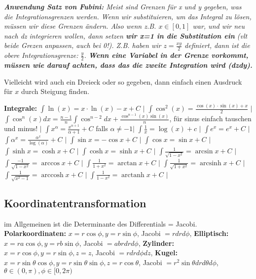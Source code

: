 \documentclass[a3paper, ngerman, 8pt]{article}
\DeclareMathOperator{\arcsinh}{arcsinh}
\DeclareMathOperator{\arccosh}{arccosh}
\DeclareMathOperator{\arctanh}{arctanh}
\begin{document}
\begin{multicols*}{3}
\textit{\textbf{Anwendung Satz von Fubini:} Meist sind Grenzen für x und y gegeben, was die Integrationsgrenzen werden. Wenn wir substituieren, um das Integral zu lösen, müssen wir diese Grenzen ändern. Also wenn z.B. $x\in [0,1]$ war, und wir neu nach dz integrieren wollen, dann setzen \textbf{wir x=1 in die Substitution ein} (vlt beide Grezen anpassen, auch bei 0!). Z.B. haben wir $z=\frac{xy}{2}$ definiert, dann ist die obere Integrationsgrenze: $\frac{y}{2}$. \textbf{Wenn eine Variabel in der Grenze vorkommt, müssen wie darauf achten, dass das die zweite Integration wird (dzdy). }}

Vielleicht wird auch ein Dreieck oder so gegeben, dann einfach einen Ausdruck für $x$ durch Steigung finden. 

\textbf{Integrale:} 
$\int \ln(x)=x\cdot \ln(x) - x + C$ $\big \vert$ 
$\int \cos^2(x)=\frac{\cos(x)\cdot \sin(x) + x}{2}$ $\big \vert$ 
$\int \cos^n(x)dx=\frac{n-1}{n}\int \cos^{n-2}dx+\frac{\cos^{n-1}(x)\sin(x)}{n}$,
für sinus einfach tauschen und minus! $\big \vert$
$\int x^{\alpha} = \frac{x^{\alpha + 1}}{\alpha + 1} + C$ falls $\alpha \neq -1 \big \vert$
$\int \frac{1}{x} = \log (x) + c$ $\big \vert$
$\int e^x = e^x + C$ $\big \vert$
$\int \alpha^{x} = \frac{\alpha^{x}}{\log (\alpha)} + C$ $\big \vert$
$\int \sin x = -\cos x + C$ $\big \vert$
$\int \cos x = \sin x + C$ $\big \vert$
$\int \sinh x = \cosh x + C$ $\big \vert$
$\int \cosh x = \sinh x + C$ $\big \vert$
$\int \frac{1}{\sqrt{1 - x^2}} = \arcsin x + C$ $\big \vert$ %
$\int \frac{-1}{\sqrt{1 - x^2}} = \arccos x + C$ $\big \vert$
$\int \frac{1}{1 + x^2} = \arctan x + C$ $\big \vert$
$\int \frac{1}{\sqrt{1 + x^2}} = \arcsinh x + C$ $\big \vert$
$\int \frac{1}{\sqrt{x^2 - 1}} = \arccosh x + C$ $\big \vert$
$\int \frac{1}{1 - x^2} = \arctanh x + C$ $\big \vert$


\subsection*{Koordinatentransformation}
im Allgemeinen ist die Determinante des Differentials = Jacobi. 
\textbf{Polarkoordinaten: } $x= r \cos\phi, y=r \sin\phi$, Jacobi $=rdrd\phi$, 
\textbf{Elliptisch:} $x=r a \cos\phi, y = r b \sin\phi$, Jacobi $=abrdrd\phi$,
\textbf{Zylinder:} $x=r \cos\phi, y=r \sin\phi, z=z$, Jacobi $=rdrd\phi dz$,
\textbf{Kugel:} $x=r \sin\theta \cos\phi, y=r \sin\theta \sin\phi, z=r \cos\theta$,
Jacobi $=r^2 \sin\theta drd\theta d\phi$, $\theta \in (0,\pi), \phi \in [0,2\pi)$


\end{multicols*}
\end{document}
